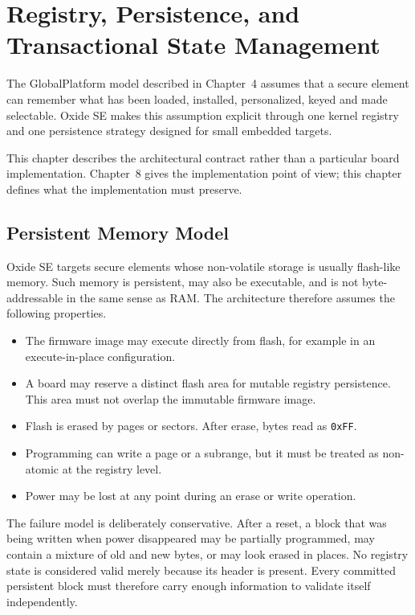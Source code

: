 \chapter{Registry, Persistence, and Transactional State Management}
\label{chap:registry-persistence}

The GlobalPlatform model described in Chapter~4 assumes that a secure
element can remember what has been loaded, installed, personalized, keyed
and made selectable. Oxide SE makes this assumption explicit through one
kernel registry and one persistence strategy designed for small embedded
targets.

This chapter describes the architectural contract rather than a particular
board implementation. Chapter~8 gives the implementation point of view;
this chapter defines what the implementation must preserve.

\section{Persistent Memory Model}
\label{sec:persistence-memory-model}

Oxide SE targets secure elements whose non-volatile storage is usually
flash-like memory. Such memory is persistent, may also be executable, and
is not byte-addressable in the same sense as RAM. The architecture
therefore assumes the following properties.

\begin{itemize}
\item The firmware image may execute directly from flash, for example in an
  execute-in-place configuration.
\item A board may reserve a distinct flash area for mutable registry
  persistence. This area must not overlap the immutable firmware image.
\item Flash is erased by pages or sectors. After erase, bytes read as
  \texttt{0xFF}.
\item Programming can write a page or a subrange, but it must be treated as
  non-atomic at the registry level.
\item Power may be lost at any point during an erase or write operation.
\end{itemize}

The failure model is deliberately conservative. After a reset, a block that
was being written when power disappeared may be partially programmed, may
contain a mixture of old and new bytes, or may look erased in places. No
registry state is considered valid merely because its header is present.
Every committed persistent block must therefore carry enough information to
validate itself independently.

